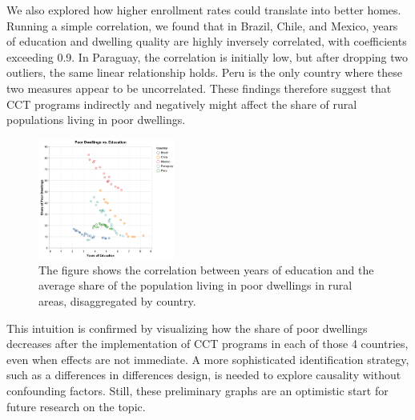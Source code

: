 \documentclass[
  10pt,
]{article}
\begin{document}
We also explored how higher enrollment rates could translate into better
homes. Running a simple correlation, we found that in Brazil, Chile, and
Mexico, years of education and dwelling quality are highly inversely
correlated, with coefficients exceeding 0.9. In Paraguay, the
correlation is initially low, but after dropping two outliers, the same
linear relationship holds. Peru is the only country where these two
measures appear to be uncorrelated. These findings therefore suggest
that CCT programs indirectly and negatively might affect the share of
rural populations living in poor dwellings.

\begin{figure}[H]

{\centering \includegraphics[width=0.4\textwidth,height=\textheight]{Graphs/corr_edu_dwelling.png}

}

\caption{The figure shows the correlation between years of education and
the average share of the population living in poor dwellings in rural
areas, disaggregated by country.}

\end{figure}%

This intuition is confirmed by visualizing how the share of poor
dwellings decreases after the implementation of CCT programs in each of
those 4 countries, even when effects are not immediate. A more
sophisticated identification strategy, such as a differences in
differences design, is needed to explore causality without confounding
factors. Still, these preliminary graphs are an optimistic start for
future research on the topic.
\end{document}
